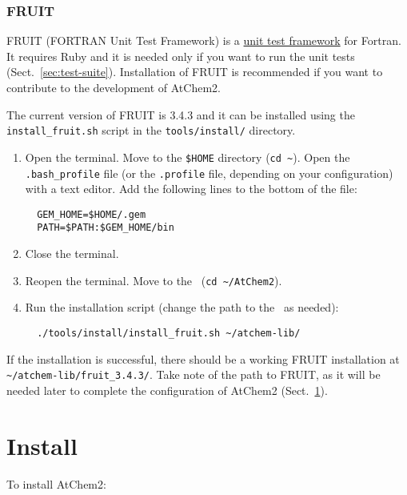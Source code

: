 \subsubsection{FRUIT}

FRUIT (FORTRAN Unit Test Framework) is a
\href{https://en.wikipedia.org/wiki/Unit_testing}{unit test framework}
for Fortran. It requires Ruby and it is needed only if you want to run
the unit tests (Sect.~\ref{sec:test-suite}). Installation of FRUIT is
recommended if you want to contribute to the development of AtChem2.

The current version of FRUIT is 3.4.3 and it can be installed using
the \texttt{install\_fruit.sh} script in the \texttt{tools/install/}
directory.

\begin{enumerate}
\item Open the terminal. Move to the \texttt{\$HOME} directory
  (\texttt{cd\ \textasciitilde}). Open the \texttt{.bash\_profile}
  file (or the \texttt{.profile} file, depending on your
  configuration) with a text editor. Add the following lines to the
  bottom of the file:
  \begin{verbatim}
  GEM_HOME=$HOME/.gem
  PATH=$PATH:$GEM_HOME/bin
  \end{verbatim}
\item Close the terminal.
\item Reopen the terminal. Move to the \maindir\ (\verb|cd ~/AtChem2|).
\item Run the installation script (change the path to the \depdir\ as
  needed):
  \begin{verbatim}
  ./tools/install/install_fruit.sh ~/atchem-lib/
  \end{verbatim}
\end{enumerate}

If the installation is successful, there should be a working FRUIT
installation at \texttt{\textasciitilde/atchem-lib/fruit\_3.4.3/}.
Take note of the path to FRUIT, as it will be needed later to complete
the configuration of AtChem2 (Sect.~\ref{sec:install}).


\section{Install} \label{sec:install}

To install AtChem2:

